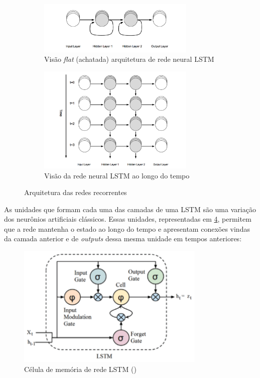 \begin{figure}[H]
  \centering
  \begin{subfigure}{7.5cm}
      \centering
      \includegraphics[width=7.5cm]{../figuras/redes/arq-rnn-flat.png}
      \caption{Visão \textit{flat} (achatada) arquitetura de rede neural LSTM }
      \label{fig:arq-rnn-flat}
  \end{subfigure}
  \begin{subfigure}{7.5cm}
    \centering
    \includegraphics[width=7.5cm]{../figuras/redes/arq-rnn.png}
    \caption{Visão da rede neural LSTM ao longo do tempo}
    \label{fig:arq-rnnff}
  \end{subfigure}
  \hfill
  \label{fig:comparacao-rnn-flat-normal}
  \caption{Arquitetura das redes recorrentes}
\end{figure}

As unidades que formam cada uma das camadas de uma LSTM são uma variação dos
neurônios artificiais clássicos. Essas unidades, representadas em \ref{fig:lstm-cell},
 permitem que a rede mantenha o estado
ao longo do tempo e apresentam conexões vindas da camada anterior e de \textit{outputs} 
dessa
mesma unidade em tempos anteriores:

\begin{figure}[H]
  \includegraphics[width=9cm]{../figuras/redes/lstm-cell.png}
  \caption{Célula de memória de rede LSTM (\cite{deeplearningbook})}
  \label{fig:lstm-cell}
\end{figure}


